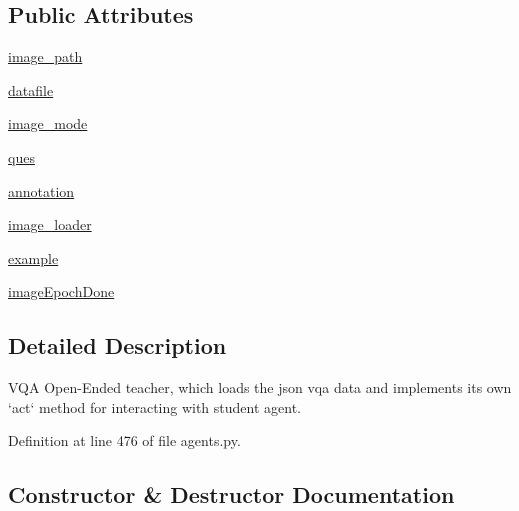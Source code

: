 \subsection*{Public Attributes}
\begin{DoxyCompactItemize}
\item 
\hyperlink{classparlai_1_1tasks_1_1vqa__v1_1_1agents_1_1OeTeacher_a93136db89c9b7943ff6aaeb28157d12e}{image\+\_\+path}
\item 
\hyperlink{classparlai_1_1tasks_1_1vqa__v1_1_1agents_1_1OeTeacher_a12671717135e971a2ec374079432b670}{datafile}
\item 
\hyperlink{classparlai_1_1tasks_1_1vqa__v1_1_1agents_1_1OeTeacher_ae600010b7db2aaf523db54fb0ef28906}{image\+\_\+mode}
\item 
\hyperlink{classparlai_1_1tasks_1_1vqa__v1_1_1agents_1_1OeTeacher_a180c1596f72999be0858a5c9c651c93a}{ques}
\item 
\hyperlink{classparlai_1_1tasks_1_1vqa__v1_1_1agents_1_1OeTeacher_ae7832c20e91858e3bbea62e333d585e5}{annotation}
\item 
\hyperlink{classparlai_1_1tasks_1_1vqa__v1_1_1agents_1_1OeTeacher_a658acd2bdd2d7c4fdd93fd0518423441}{image\+\_\+loader}
\item 
\hyperlink{classparlai_1_1tasks_1_1vqa__v1_1_1agents_1_1OeTeacher_ae9a071fc33afe67bfeae01dbd2857608}{example}
\item 
\hyperlink{classparlai_1_1tasks_1_1vqa__v1_1_1agents_1_1OeTeacher_a5db996acbd73e3fc6f45d69dd61fcefd}{image\+Epoch\+Done}
\end{DoxyCompactItemize}


\subsection{Detailed Description}
\begin{DoxyVerb}VQA Open-Ended teacher, which loads the json vqa data and implements its own `act`
method for interacting with student agent.
\end{DoxyVerb}
 

Definition at line 476 of file agents.\+py.



\subsection{Constructor \& Destructor Documentation}
\mbox{\label{classparlai_1_1tasks_1_1vqa__v1_1_1agents_1_1OeTeacher_a508a90334629ef603b9520a98b5200a0}} 
